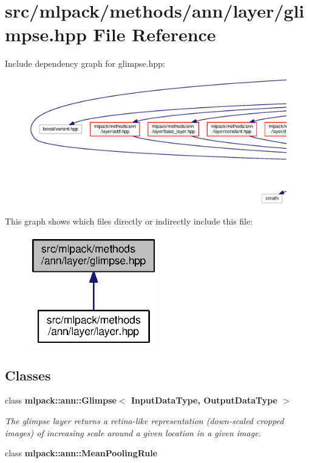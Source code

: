 \section{src/mlpack/methods/ann/layer/glimpse.hpp File Reference}
\label{glimpse_8hpp}
Include dependency graph for glimpse.\+hpp\+:
\nopagebreak
\begin{figure}[H]
\begin{center}
\leavevmode
\includegraphics[width=350pt]{glimpse_8hpp__incl}
\end{center}
\end{figure}
This graph shows which files directly or indirectly include this file\+:
\nopagebreak
\begin{figure}[H]
\begin{center}
\leavevmode
\includegraphics[width=159pt]{glimpse_8hpp__dep__incl}
\end{center}
\end{figure}
\subsection*{Classes}
\begin{DoxyCompactItemize}
\item 
class {\bf mlpack\+::ann\+::\+Glimpse$<$ Input\+Data\+Type, Output\+Data\+Type $>$}
\begin{DoxyCompactList}\small\item\em The glimpse layer returns a retina-\/like representation (down-\/scaled cropped images) of increasing scale around a given location in a given image. \end{DoxyCompactList}\item 
class {\bf mlpack\+::ann\+::\+Mean\+Pooling\+Rule}
\end{DoxyCompactItemize}
